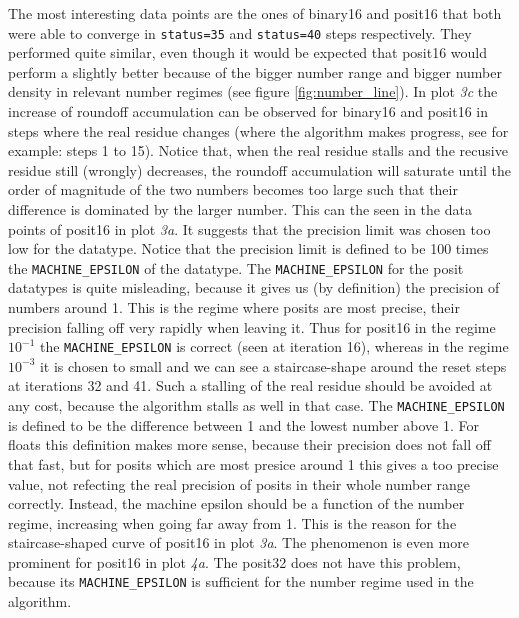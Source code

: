 \documentclass{article}
\theoremstyle{plain} %
\theoremstyle{remark} %
\def\code#1{\texttt{#1}}
\numberwithin{equation}{section}
\begin{document}
The most interesting data points are the ones of \gls{binary16} and \gls{posit16} that both were able to converge in \code{status=35} and \code{status=40} steps respectively. They performed quite similar, even though it would be expected that \gls{posit16} would perform a slightly better because of the bigger number range and bigger number density in relevant number regimes (see figure \ref{fig:number_line}). In plot \textit{3c} the increase of roundoff accumulation can be observed for \gls{binary16} and \gls{posit16} in steps where the real residue changes (where the algorithm makes progress, see for example: steps \num{1} to \num{15}). Notice that, when the real residue stalls and the recusive residue still (wrongly) decreases, the roundoff accumulation will saturate until the order of magnitude of the two numbers becomes too large such that their difference is dominated by the larger number. This can the seen in the data points of \gls{posit16} in plot \textit{3a}. It suggests that the precision limit was chosen too low for the datatype. Notice that the precision limit is defined to be \num{100} times the \code{MACHINE\_EPSILON} of the datatype. The \code{MACHINE\_EPSILON} for the posit datatypes is quite misleading, because it gives us (by definition) the precision of numbers around \num{1}. This is the regime where posits are most precise, their precision falling off very rapidly when leaving it. Thus for \gls{posit16} in the regime $10^{-1}$ the \code{MACHINE\_EPSILON} is correct (seen at iteration \num{16}), whereas in the regime $10^{-3}$ it is chosen to small and we can see a staircase-shape around the reset steps at iterations \num{32} and \num{41}. Such a stalling of the real residue should be avoided at any cost, because the algorithm stalls as well in that case. The \code{MACHINE\_EPSILON} is defined to be the difference between \num{1} and the lowest number above \num{1}. For floats this definition makes more sense, because their precision does not fall off that fast, but for posits which are most presice around \num{1} this gives a too precise value, not refecting the real precision of posits in their whole number range correctly. Instead, the machine epsilon should be a function of the number regime, increasing when going far away from \num{1}. This is the reason for the staircase-shaped curve of \gls{posit16} in plot \textit{3a}. The phenomenon is even more prominent for \gls{posit16} in plot \textit{4a}. The \gls{posit32} does not have this problem, because its \code{MACHINE\_EPSILON} is sufficient for the number regime used in the algorithm.
\end{document}
